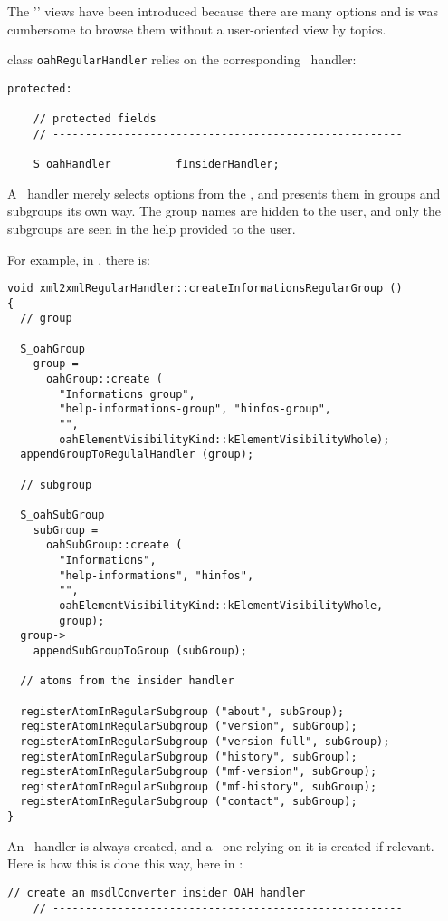 {The '\regular' views have been introduced because there are many options and is was cumbersome to browse them without a user-oriented view by topics.

class   {\tt oahRegularHandler} relies on the corresponding \insider\ handler:
\begin{lstlisting}[language=CPlusPlus]
  protected:

    // protected fields
    // ------------------------------------------------------

    S_oahHandler          fInsiderHandler;
\end{lstlisting}

A \regular\ handler merely selects options from the , and presents them in groups and subgroups its own way. The group names are hidden to the user, and only the subgroups are seen in the help provided to the user.

For example, in , there is:
\begin{lstlisting}[language=CPlusPlus]
void xml2xmlRegularHandler::createInformationsRegularGroup ()
{
  // group

  S_oahGroup
    group =
      oahGroup::create (
        "Informations group",
        "help-informations-group", "hinfos-group",
        "",
        oahElementVisibilityKind::kElementVisibilityWhole);
  appendGroupToRegulalHandler (group);

  // subgroup

  S_oahSubGroup
    subGroup =
      oahSubGroup::create (
        "Informations",
        "help-informations", "hinfos",
        "",
        oahElementVisibilityKind::kElementVisibilityWhole,
        group);
  group->
    appendSubGroupToGroup (subGroup);

  // atoms from the insider handler

  registerAtomInRegularSubgroup ("about", subGroup);
  registerAtomInRegularSubgroup ("version", subGroup);
  registerAtomInRegularSubgroup ("version-full", subGroup);
  registerAtomInRegularSubgroup ("history", subGroup);
  registerAtomInRegularSubgroup ("mf-version", subGroup);
  registerAtomInRegularSubgroup ("mf-history", subGroup);
  registerAtomInRegularSubgroup ("contact", subGroup);
}
\end{lstlisting}


An \insider\ handler is always created, and a \regular\ one relying on it is created if relevant. Here is how this is done this way, here in :
\begin{lstlisting}[language=CPlusPlus]
    // create an msdlConverter insider OAH handler
    // ------------------------------------------------------


\end{lstlisting}}
